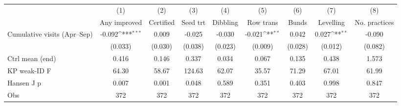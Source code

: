 {
\def\sym#1{\ifmmode^{#1}\else\(^{#1}\)\fi}
\begin{tabular}{l*{8}{c}}
\toprule
                    &\multicolumn{1}{c}{(1)}&\multicolumn{1}{c}{(2)}&\multicolumn{1}{c}{(3)}&\multicolumn{1}{c}{(4)}&\multicolumn{1}{c}{(5)}&\multicolumn{1}{c}{(6)}&\multicolumn{1}{c}{(7)}&\multicolumn{1}{c}{(8)}\\
                    &\multicolumn{1}{c}{Any improved}&\multicolumn{1}{c}{Certified}&\multicolumn{1}{c}{Seed trt}&\multicolumn{1}{c}{Dibbling}&\multicolumn{1}{c}{Row trans}&\multicolumn{1}{c}{Bunds}&\multicolumn{1}{c}{Levelling}&\multicolumn{1}{c}{No. practices}\\
\midrule
Cumulative visits (Apr--Sep)&      -0.092\sym{***}&       0.009         &      -0.025         &      -0.030         &      -0.021\sym{**} &       0.042         &       0.027\sym{**} &      -0.090         \\
                    &     (0.033)         &     (0.030)         &     (0.038)         &     (0.023)         &     (0.009)         &     (0.028)         &     (0.012)         &     (0.082)         \\
\midrule
Ctrl mean (end)     &       0.416         &       0.146         &       0.337         &       0.034         &       0.067         &       0.135         &       0.438         &       1.573         \\
KP weak-ID F        &       64.30         &       58.67         &      124.63         &       62.07         &       35.57         &       71.29         &       67.01         &       61.99         \\
Hansen J p          &       0.007         &       0.001         &       0.048         &       0.589         &       0.351         &       0.403         &       0.998         &       0.847         \\
Obs                 &         372         &         372         &         372         &         372         &         372         &         372         &         372         &         372         \\
\bottomrule
\end{tabular}
}
